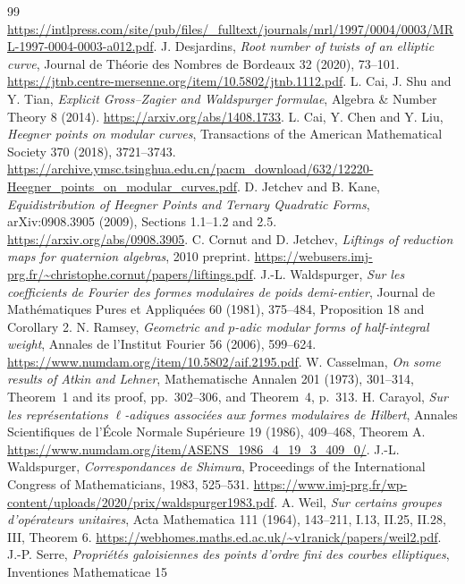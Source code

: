 \documentclass[11pt]{article}
\theoremstyle{definition}
\theoremstyle{remark}
\begin{document}
\begin{thebibliography}{99}
\url{https://intlpress.com/site/pub/files/_fulltext/journals/mrl/1997/0004/0003/MRL-1997-0004-0003-a012.pdf}.
 J. Desjardins, \emph{Root number of twists of an
elliptic curve}, Journal de Th\'eorie des Nombres de Bordeaux
32 (2020), 73--101. \url{https://jtnb.centre-mersenne.org/item/10.5802/jtnb.1112.pdf}.
 L. Cai, J. Shu and Y. Tian, \emph{Explicit Gross--Zagier
and Waldspurger formulae}, Algebra \& Number Theory 8 (2014).
\url{https://arxiv.org/abs/1408.1733}.
 L. Cai, Y. Chen and Y. Liu, \emph{Heegner points on modular
curves}, Transactions of the American Mathematical Society 370 (2018),
3721--3743. \url{https://archive.ymsc.tsinghua.edu.cn/pacm_download/632/12220-Heegner_points_on_modular_curves.pdf}.
 D. Jetchev and B. Kane,
\emph{Equidistribution of Heegner Points and Ternary Quadratic Forms},
arXiv:0908.3905 (2009), Sections 1.1--1.2 and 2.5.
\url{https://arxiv.org/abs/0908.3905}.
 C. Cornut and D. Jetchev,
\emph{Liftings of reduction maps for quaternion algebras}, 2010 preprint.
\url{https://webusers.imj-prg.fr/~christophe.cornut/papers/liftings.pdf}.
 J.-L. Waldspurger, \emph{Sur les coefficients de
Fourier des formes modulaires de poids demi-entier},
Journal de Math\'ematiques Pures et Appliqu\'ees 60 (1981), 375--484,
Proposition 18 and Corollary 2.
 N. Ramsey, \emph{Geometric and $p$-adic modular forms
of half-integral weight}, Annales de l'Institut Fourier 56 (2006),
599--624. \url{https://www.numdam.org/item/10.5802/aif.2195.pdf}.
W. Casselman, \emph{On some results of Atkin and Lehner},
Mathematische Annalen 201 (1973), 301--314,
Theorem~1 and its proof, pp.~302--306, and Theorem~4, p.~313.
 H. Carayol, \emph{Sur les repr\'esentations
$\ell$-adiques associ\'ees aux formes modulaires de Hilbert},
Annales Scientifiques de l'\'Ecole Normale Sup\'erieure 19 (1986), 409--468,
Theorem A. \url{https://www.numdam.org/item/ASENS_1986_4_19_3_409_0/}.
 J.-L. Waldspurger,
\emph{Correspondances de Shimura}, Proceedings of the International
Congress of Mathematicians, 1983, 525--531.
\url{https://www.imj-prg.fr/wp-content/uploads/2020/prix/waldspurger1983.pdf}.
 A. Weil, \emph{Sur certains groupes d'op\'erateurs unitaires},
Acta Mathematica 111 (1964), 143--211, I.13, II.25, II.28, III, Theorem 6.
\url{https://webhomes.maths.ed.ac.uk/~v1ranick/papers/weil2.pdf}.
 J.-P. Serre, \emph{Propri\'et\'es galoisiennes des points
d'ordre fini des courbes elliptiques}, Inventiones Mathematicae 15

\end{thebibliography}
\end{document}
